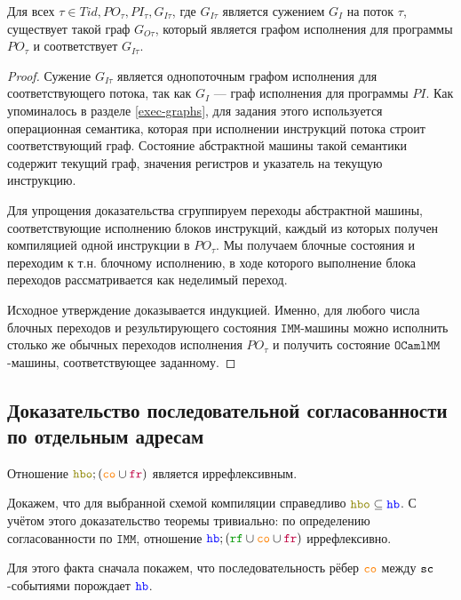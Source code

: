 \documentclass[14pt]{matmex-diploma-custom}
\newcommand{\IMM}{\mathtt{IMM}}
\newcommand{\OMM}{\mathtt{OCaml}\allowbreak \mathtt{MM}}
\begin{document}
\begin{lemma} \label{corresponding-existence-single}
  Для всех $\tau\in Tid, PO_\tau, PI_\tau, G_{I\tau}$, где $G_{I\tau}$ является сужением $G_I$ на поток $\tau$, существует такой граф $G_{O\tau}$, который является графом исполнения для программы $PO_\tau$ и соответствует $G_{I\tau}$. 
\end{lemma}
\begin{proof}
  Сужение $G_{I\tau}$ является однопоточным графом исполнения для соответствующего потока, так как $G_{I}$ --- граф исполнения для программы $PI$. Как упоминалось в разделе \ref{exec-graphs}, для задания этого используется операционная семантика, которая при исполнении инструкций потока строит соответствующий граф. Состояние абстрактной машины такой семантики содержит текущий граф, значения регистров и указатель на текущую инструкцию. 

  Для упрощения доказательства сгруппируем переходы абстрактной машины, соответствующие исполнению блоков инструкций, каждый из которых получен компиляцией одной инструкции в $PO_\tau$. Мы получаем блочные состояния и  переходим к т.н.  блочному исполнению, в ходе которого выполнение блока переходов рассматривается как неделимый переход.

  Исходное утверждение доказывается индукцией. Именно, для любого числа блочных переходов и результирующего состояния $\IMM$-машины можно исполнить столько же обычных переходов исполнения $PO_\tau$ и получить состояние $\OMM$-машины, соответствующее заданному.
\end{proof}


\subsection{Доказательство последовательной согласованности по отдельным адресам}
\label{corr-coherence}

\begin{theorem} \label{corr-coherence-thm}
  Отношение $\lHBO ; (\lCO\cup \lFR)$ является иррефлексивным. 
\end{theorem}
Докажем, что для выбранной схемой компиляции справедливо $\lHBO \subseteq \lHB$. С учётом этого доказательство теоремы тривиально: по определению согласованности по $\IMM$, отношение $\lHB ; (\lRF \cup \lCO \cup \lFR)$ иррефлексивно. 

Для этого факта сначала покажем, что последовательность рёбер $\lCO$ между ${\mathtt{sc}}$-событиями порождает $\lHB$.
\end{document}
